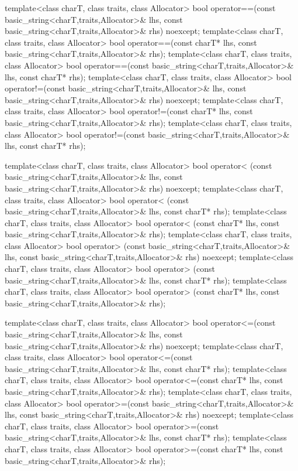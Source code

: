 \begin{codeblock}
{  template<class charT, class traits, class Allocator>
    bool operator==(const basic_string<charT,traits,Allocator>& lhs,
                    const basic_string<charT,traits,Allocator>& rhs) noexcept;
  template<class charT, class traits, class Allocator>
    bool operator==(const charT* lhs,
                    const basic_string<charT,traits,Allocator>& rhs);
  template<class charT, class traits, class Allocator>
    bool operator==(const basic_string<charT,traits,Allocator>& lhs,
                    const charT* rhs);
  template<class charT, class traits, class Allocator>
    bool operator!=(const basic_string<charT,traits,Allocator>& lhs,
                    const basic_string<charT,traits,Allocator>& rhs) noexcept;
  template<class charT, class traits, class Allocator>
    bool operator!=(const charT* lhs,
                    const basic_string<charT,traits,Allocator>& rhs);
  template<class charT, class traits, class Allocator>
    bool operator!=(const basic_string<charT,traits,Allocator>& lhs,
                    const charT* rhs);

  template<class charT, class traits, class Allocator>
    bool operator< (const basic_string<charT,traits,Allocator>& lhs,
                    const basic_string<charT,traits,Allocator>& rhs) noexcept;
  template<class charT, class traits, class Allocator>
    bool operator< (const basic_string<charT,traits,Allocator>& lhs,
                    const charT* rhs);
  template<class charT, class traits, class Allocator>
    bool operator< (const charT* lhs,
                    const basic_string<charT,traits,Allocator>& rhs);
  template<class charT, class traits, class Allocator>
    bool operator> (const basic_string<charT,traits,Allocator>& lhs,
                    const basic_string<charT,traits,Allocator>& rhs) noexcept;
  template<class charT, class traits, class Allocator>
    bool operator> (const basic_string<charT,traits,Allocator>& lhs,
                    const charT* rhs);
  template<class charT, class traits, class Allocator>
    bool operator> (const charT* lhs,
                    const basic_string<charT,traits,Allocator>& rhs);

  template<class charT, class traits, class Allocator>
    bool operator<=(const basic_string<charT,traits,Allocator>& lhs,
                    const basic_string<charT,traits,Allocator>& rhs) noexcept;
  template<class charT, class traits, class Allocator>
    bool operator<=(const basic_string<charT,traits,Allocator>& lhs,
                    const charT* rhs);
  template<class charT, class traits, class Allocator>
    bool operator<=(const charT* lhs,
                    const basic_string<charT,traits,Allocator>& rhs);
  template<class charT, class traits, class Allocator>
    bool operator>=(const basic_string<charT,traits,Allocator>& lhs,
                    const basic_string<charT,traits,Allocator>& rhs) noexcept;
  template<class charT, class traits, class Allocator>
    bool operator>=(const basic_string<charT,traits,Allocator>& lhs,
                    const charT* rhs);
  template<class charT, class traits, class Allocator>
    bool operator>=(const charT* lhs,
                    const basic_string<charT,traits,Allocator>& rhs);

}
\end{codeblock}
